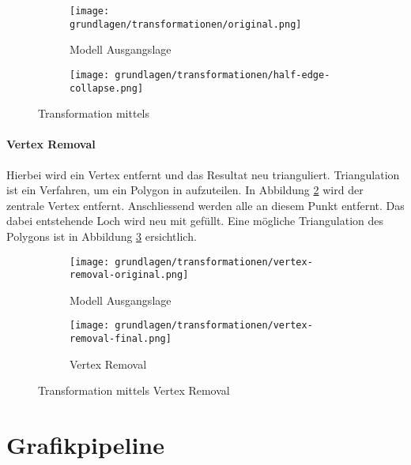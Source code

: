 \begin{figure}[H]
  \centering
  \begin{subfigure}{.5\textwidth}
    \centering
    \texttt{[image: grundlagen/transformationen/original.png]}
    \caption{Modell Ausgangslage}
  \end{subfigure}%
  \begin{subfigure}{.5\textwidth}
    \centering
    \texttt{[image: grundlagen/transformationen/half-edge-collapse.png]}
    \caption{}
  \end{subfigure}
  \caption{Transformation mittels }
  \label{fig:transformationHalfedgeCollapse}
\end{figure}

\paragraph{Vertex Removal}
Hierbei wird ein Vertex entfernt und das Resultat neu trianguliert. Triangulation ist ein Verfahren, um ein Polygon in  aufzuteilen.
In Abbildung \ref{fig:transformationVertexRemovalOriginal} wird der zentrale Vertex entfernt. Anschliessend werden alle  an diesem Punkt entfernt. Das dabei entstehende Loch wird neu mit  gefüllt. Eine mögliche Triangulation des Polygons ist in Abbildung \ref{fig:transformationVertexRemovalFinal} ersichtlich.


\begin{figure}[H]
  \centering
  \begin{subfigure}{.5\textwidth}
    \centering
    \texttt{[image: grundlagen/transformationen/vertex-removal-original.png]}
    \caption{Modell Ausgangslage}
    \label{fig:transformationVertexRemovalOriginal}
  \end{subfigure}%
  \begin{subfigure}{.5\textwidth}
    \centering
    \texttt{[image: grundlagen/transformationen/vertex-removal-final.png]}
    \caption{Vertex Removal}
    \label{fig:transformationVertexRemovalFinal}
  \end{subfigure}
  \caption{Transformation mittels Vertex Removal}
  \label{fig:transformationVertexRemoval}
\end{figure}

\section{Grafikpipeline}

